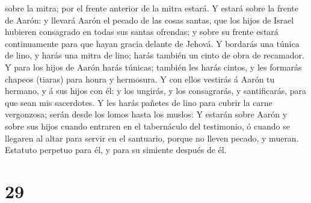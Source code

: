 sobre la mitra; por el frente anterior de la mitra estará. 
Y estará sobre la frente de Aarón: y llevará Aarón el pecado de las
cosas santas, que los hijos de Israel hubieren consagrado en todas sus
santas ofrendas; y sobre su frente estará continuamente para que hayan
gracia delante de Jehová.  Y bordarás una túnica de lino, y
harás una mitra de lino; harás también un cinto de obra de recamador.
 Y para los hijos de Aarón harás túnicas; también les harás
cintos, y les formarás chapeos (tiaras) para honra y hermosura.
 Y con ellos vestirás á Aarón tu hermano, y á sus hijos con
él: y los ungirás, y los consagrarás, y santificarás, para que sean mis
sacerdotes.  Y les harás pañetes de lino para cubrir la
carne vergonzosa; serán desde los lomos hasta los muslos: 
Y estarán sobre Aarón y sobre sus hijos cuando entraren en el
tabernáculo del testimonio, ó cuando se llegaren al altar para servir en
el santuario, porque no lleven pecado, y mueran. Estatuto perpetuo para
él, y para su simiente después de él.

\hypertarget{section-28}{%
\section{29}\label{section-28}}


